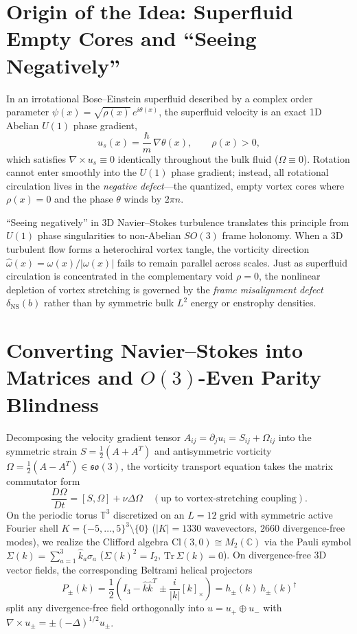 \documentclass[11pt,a4paper]{article}
\begin{document}
\section{Origin of the Idea: Superfluid Empty Cores and ``Seeing Negatively''}

In an irrotational Bose--Einstein superfluid described by a complex order parameter $\psi(x) = \sqrt{\rho(x)}\,e^{i\theta(x)}$, the superfluid velocity is an exact 1D Abelian $U(1)$ phase gradient,
\begin{equation}
  u_s(x) = \frac{\hbar}{m}\,\nabla\theta(x), \qquad \rho(x) > 0,
\end{equation}
which satisfies $\nabla \times u_s \equiv 0$ identically throughout the bulk fluid ($\Omega \equiv 0$). Rotation cannot enter smoothly into the $U(1)$ phase gradient; instead, all rotational circulation lives in the \emph{negative defect}---the quantized, empty vortex cores where $\rho(x) = 0$ and the phase $\theta$ winds by $2\pi n$.

``Seeing negatively'' in 3D Navier--Stokes turbulence translates this principle from $U(1)$ phase singularities to non-Abelian $SO(3)$ frame holonomy. When a 3D turbulent flow forms a heterochiral vortex tangle, the vorticity direction $\hat{\omega}(x) = \omega(x)/|\omega(x)|$ fails to remain parallel across scales. Just as superfluid circulation is concentrated in the complementary void $\rho = 0$, the nonlinear depletion of vortex stretching is governed by the \emph{frame misalignment defect} $\delta_{\mathrm{NS}}(b)$ rather than by symmetric bulk $L^2$ energy or enstrophy densities.

\section{Converting Navier--Stokes into Matrices and \texorpdfstring{$O(3)$}{O(3)}-Even Parity Blindness}

Decomposing the velocity gradient tensor $A_{ij} = \partial_j u_i = S_{ij} + \Omega_{ij}$ into the symmetric strain $S = \frac{1}{2}(A + A^T)$ and antisymmetric vorticity $\Omega = \frac{1}{2}(A - A^T) \in \mathfrak{so}(3)$, the vorticity transport equation takes the matrix commutator form
\begin{equation}
  \frac{D\Omega}{Dt} = [S, \Omega] + \nu\Delta\Omega \quad (\text{up to vortex-stretching coupling}).
\end{equation}
On the periodic torus $\mathbb{T}^3$ discretized on an $L = 12$ grid with symmetric active Fourier shell $K = \{-5,\dots,5\}^3 \setminus \{0\}$ ($|K| = 1330$ wavevectors, $2660$ divergence-free modes), we realize the Clifford algebra $\mathrm{Cl}(3,0) \cong M_2(\mathbb{C})$ via the Pauli symbol $\Sigma(k) = \sum_{a=1}^3 \hat{k}_a \sigma_a$ ($\Sigma(k)^2 = I_2$, $\mathrm{Tr}\,\Sigma(k) = 0$). On divergence-free 3D vector fields, the corresponding Beltrami helical projectors
\begin{equation}
  P_\pm(k) = \frac{1}{2}\!\left(I_3 - \hat{k}\hat{k}^T \pm \frac{i}{|k|}[k]_\times\right) = h_\pm(k)\,h_\pm(k)^\dagger
\end{equation}
split any divergence-free field orthogonally into $u = u_+ \oplus u_-$ with $\nabla \times u_\pm = \pm(-\Delta)^{1/2} u_\pm$.
\end{document}
